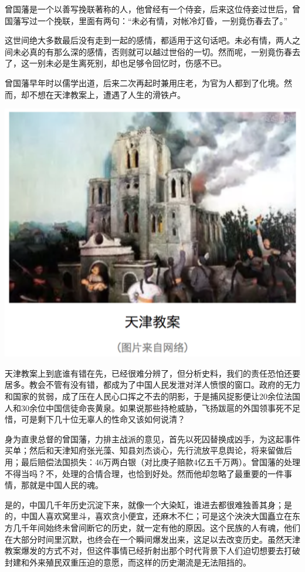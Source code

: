 \documentclass[]{book}
\begin{document}
曾国藩是一个以善写挽联著称的人，他曾经有一个侍妾，后来这位侍妾过世后，曾国藩写过一个挽联，里面有两句：``未必有情，对帐冷灯昏，一别竟伤春去了。''

这世间绝大多数最后没有走到一起的感情，都适用于这句话吧。未必有情，两人之间未必真的有那么深的感情，否则就可以越过世俗的一切。然而呢，一别竟伤春去了，这一别未必是生离死别，却也足够令回忆时，伤感不已。

曾国藩早年时以儒学出道，后来二次再起时兼用庄老，为官为人都到了化境。然而，却不想在天津教案上，遭遇了人生的滑铁卢。

\includegraphics[width=6.67in]{images/his3}

天津教案上到底谁有错在先，已经很难分辨了，但分析史料，我们的责任恐怕还要居多。教会不管有没有错，都成为了中国人民发泄对洋人愤恨的窗口。政府的无力和国家的贫弱，成了压在人民心口挥之不去的阴影，于是捕风捉影便让20余位法国人和30余位中国信徒命丧黄泉。如果说那些持枪威胁，飞扬跋扈的外国领事死不足惜，可是剩下几十位无辜人的性命又该如何说清？

身为直隶总督的曾国藩，力排主战派的意见，首先以死囚替换成凶手，为这起事件买单；然后和天津知府张光藻、知县刘杰谈心，先行流放平息舆论，将来留做后用；最后赔偿法国损失：46万两白银（对比庚子赔款4亿五千万两）。曾国藩的处理不得当吗？不，处理的合情合理，也恰到好处。然而他却忽略了最重要的一件事情，那就是中国人民的魂。

是的，中国几千年历史沉淀下来，就像一个大染缸，谁进去都很难独善其身；是的，中国人喜欢窝里斗，喜欢贪小便宜，还麻木不仁；可是这个泱泱大国矗立在东方几千年间始终未曾间断它的历史，就一定有他的原因。这个民族的人有魂，他们在大部分时间里沉默，也终会在一个瞬间爆发出来，这足以去改变历史。虽然天津教案爆发的方式不对，但这件事情已经折射出那个时代背景下人们迫切想要去打破封建和外来殖民双重压迫的意愿，而这样的历史潮流是无法阻挡的。
\end{document}
